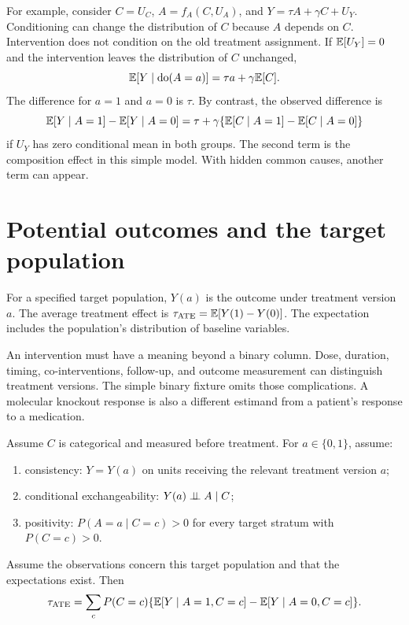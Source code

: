 \documentclass[11pt,oneside]{scrbook}
\begin{document}
For example, consider $C=U_C$, $A=f_A(C,U_A)$, and
$Y=\tau A+\gamma C+U_Y$. Conditioning can change the distribution of $C$ because
$A$ depends on $C$. Intervention does not condition on the old treatment assignment.
If $\mathbb{E}[U_Y]=0$ and the intervention leaves the distribution of $C$ unchanged,
\[
\mathbb{E}[Y\mid\operatorname{do}(A=a)]=\tau a+\gamma\mathbb{E}[C].
\]
The difference for $a=1$ and $a=0$ is $\tau$. By contrast, the observed difference is
\[
\mathbb{E}[Y\mid A=1]-\mathbb{E}[Y\mid A=0]
=\tau+\gamma\{\mathbb{E}[C\mid A=1]-\mathbb{E}[C\mid A=0]\}
\]
if $U_Y$ has zero conditional mean in both groups. The second term is the composition
effect in this simple model. With hidden common causes, another term can appear.

\section{Potential outcomes and the target population}
\begin{definition}
For a specified target population, $Y(a)$ is the outcome under treatment version $a$.
The average treatment effect is
$\tau_{\mathrm{ATE}}=\mathbb{E}[Y(1)-Y(0)]$.
The expectation includes the population's distribution of baseline variables.
\end{definition}

An intervention must have a meaning beyond a binary column. Dose, duration, timing,
co-interventions, follow-up, and outcome measurement can distinguish treatment versions.
The simple binary fixture omits those complications. A molecular knockout response is
also a different estimand from a patient's response to a medication.

\begin{theorem}
Assume $C$ is categorical and measured before treatment. For $a\in\{0,1\}$, assume:
\begin{enumerate}
\item consistency: $Y=Y(a)$ on units receiving the relevant treatment version $a$;
\item conditional exchangeability: $Y(a)\perp\!\!\!\perp A\mid C$;
\item positivity: $P(A=a\mid C=c)>0$ for every target stratum with $P(C=c)>0$.
\end{enumerate}
Assume the observations concern this target population and that the expectations exist.
Then
\[
\tau_{\mathrm{ATE}}=\sum_c P(C=c)
\{\mathbb{E}[Y\mid A=1,C=c]-\mathbb{E}[Y\mid A=0,C=c]\}.
\]
\end{theorem}
\end{document}
